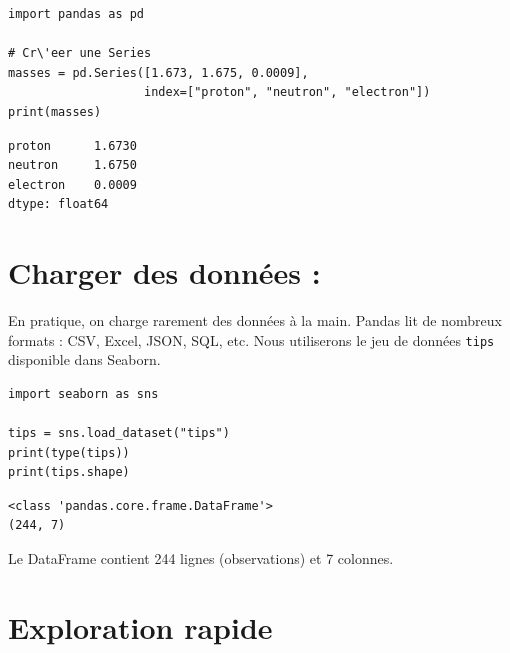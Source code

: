 \begin{codeblock}[title=\textbf{Python}]
\begin{verbatim}
import pandas as pd

# Cr\'eer une Series
masses = pd.Series([1.673, 1.675, 0.0009],
                   index=["proton", "neutron", "electron"])
print(masses)
\end{verbatim}
\end{codeblock}

\begin{codeoutput}
\begin{verbatim}
proton      1.6730
neutron     1.6750
electron    0.0009
dtype: float64
\end{verbatim}
\end{codeoutput}

\section{Charger des donn\'ees : }

En pratique, on charge rarement des donn\'ees \`a la main. Pandas lit de nombreux
formats : CSV, Excel, JSON, SQL, etc. Nous utiliserons le jeu de donn\'ees
\texttt{tips} disponible dans Seaborn.

\begin{codeblock}[title=\textbf{Python}]
\begin{verbatim}
import seaborn as sns

tips = sns.load_dataset("tips")
print(type(tips))
print(tips.shape)
\end{verbatim}
\end{codeblock}

\begin{codeoutput}
\begin{verbatim}
<class 'pandas.core.frame.DataFrame'>
(244, 7)
\end{verbatim}
\end{codeoutput}

Le DataFrame  contient 244 lignes (observations) et 7 colonnes.

\section{Exploration rapide}

